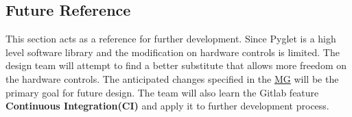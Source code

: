 \documentclass{article}
\begin{document}
\subsection{Future Reference}
This section acts as a reference for further development. Since Pyglet is a high level software library and the modification on hardware controls is limited. The design team will attempt to find a better substitute that allows more freedom on the hardware controls. The anticipated changes specified in the \href{https://gitlab.cas.mcmaster.ca/wangs132/minecraft/-/blob/master/Doc/Design/MG/MG.pdf}{MG} will be the primary goal for future design. The team will also learn the Gitlab feature \textbf{Continuous Integration(CI)} and apply it to further development process.
\end{document}
